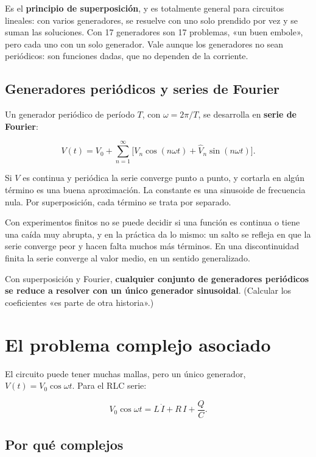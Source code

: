 \documentclass[12pt,a4paper]{article}
\begin{document}
Es el \textbf{principio de superposición}, y es totalmente general para circuitos
lineales: con varios generadores, se resuelve con uno solo prendido por vez y
se suman las soluciones. Con 17 generadores son 17 problemas, «un buen
embole», pero cada uno con un solo generador. Vale aunque los generadores no
sean periódicos: son funciones dadas, que no dependen de la corriente.

\subsection{Generadores periódicos y series de Fourier}

Un generador periódico de período $T$, con $\omega = 2\pi/T$, se desarrolla en
\textbf{serie de Fourier}:

\[
V(t) = V_0 + \sum_{n=1}^{\infty}\Big[V_n\cos(n\omega t) + \hat V_n\sin(n\omega t)\Big].
\]

Si $V$ es continua y periódica la serie converge punto a punto, y cortarla en
algún término es una buena aproximación. La constante es una sinusoide de
frecuencia nula. Por superposición, cada término se trata por separado.

\begin{notebox}[Discontinuidades]
Con experimentos finitos no se puede decidir si una
función es continua o tiene una caída muy abrupta, y en la práctica da lo
mismo: un salto se refleja en que la serie converge peor y hacen falta muchos
más términos. En una discontinuidad finita la serie converge al valor medio,
en un sentido generalizado.
\end{notebox}

Con superposición y Fourier, \textbf{cualquier conjunto de generadores periódicos se
reduce a resolver con un único generador sinusoidal}. (Calcular los
coeficientes «es parte de otra historia».)

\section{El problema complejo asociado}

El circuito puede tener muchas mallas, pero un único generador,
$V(t) = V_0\cos\omega t$. Para el RLC serie:

\[
V_0\cos\omega t = L\,\dot I + R\,I + \frac{Q}{C}.
\]

\subsection{Por qué complejos}
\end{document}
